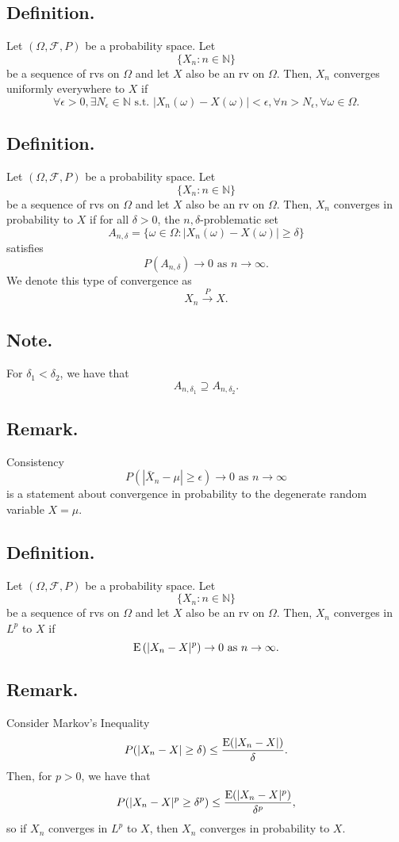 \documentclass[titlepage]{article}
\begin{document}
\subsection{Definition.} Let $(\Omega, \mathcal{F}, P)$ be a probability space. Let
$$\{X_{n}: n \in \mathbb{N}\}$$
be a sequence of rvs on $\Omega$ and let $X$ also be an rv on $\Omega$. Then, $X_{n}$ converges uniformly everywhere to $X$ if 
$$\forall \epsilon > 0, \exists N_{\epsilon} \in \mathbb{N} \text{ s.t. } |X_{n}(\omega) - X(\omega)| < \epsilon, \forall n > N_{\epsilon}, \forall \omega \in \Omega.$$ 

\subsection{Definition.} Let $(\Omega, \mathcal{F}, P)$ be a probability space. Let
$$\{X_{n}: n \in \mathbb{N}\}$$
be a sequence of rvs on $\Omega$ and let $X$ also be an rv on $\Omega$. Then, $X_{n}$ converges in probability to $X$ if for all $\delta > 0$, the $n,\delta$-problematic set 
$$A_{n,\delta} = \{\omega \in \Omega: |X_{n}(\omega) - X(\omega)| \geq \delta\}$$
satisfies 
$$P(A_{n,\delta}) \to 0 \text{ as } n \to \infty.$$
We denote this type of convergence as 
$$X_{n} \xrightarrow{P} X.$$

\subsection{Note.} For $\delta_{1} < \delta_{2}$, we have that 
$$A_{n,\delta_{1}} \supseteq A_{n,\delta_{2}}.$$

\subsection{Remark.} Consistency 
$$P\left(|\bar{X}_{n} - \mu| \geq \epsilon\right) \to 0 \text{ as } n \to \infty$$
is a statement about convergence in probability to the degenerate random variable $X = \mu$.

\subsection{Definition.} Let $(\Omega, \mathcal{F}, P)$ be a probability space. Let
$$\{X_{n}: n \in \mathbb{N}\}$$
be a sequence of rvs on $\Omega$ and let $X$ also be an rv on $\Omega$. Then, $X_{n}$ converges in $L^{p}$ to $X$ if
$$\text{E}\left(|X_{n} - X|^{p}\right) \to 0 \text{ as } n \to \infty.$$

\subsection{Remark.} Consider Markov's Inequality 
$$P(|X_{n} - X| \geq \delta) \leq \frac{\text{E}(|X_{n} - X|)}{\delta}.$$
Then, for $p > 0$, we have that 
$$P(|X_{n} - X|^{p} \geq \delta^{p}) \leq \frac{\text{E}(|X_{n} - X|^{p})}{\delta^{p}},$$
so if $X_{n}$ converges in $L^{p}$ to $X$, then $X_{n}$ converges in probability to $X$.
\end{document}

